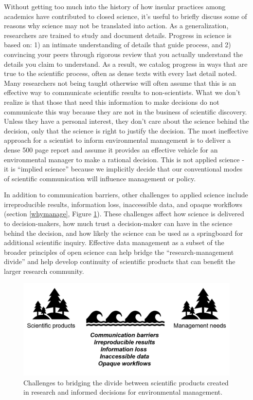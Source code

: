 \documentclass[
]{book}
\begin{document}
Without getting too much into the history of how insular practices among academics have contributed to closed science, it's useful to briefly discuss some of reasons why science may not be translated into action. As a generalization, researchers are trained to study and document details. Progress in science is based on: 1) an intimate understanding of details that guide process, and 2) convincing your peers through rigorous review that you actually understand the details you claim to understand. As a result, we catalog progress in ways that are true to the scientific process, often as dense texts with every last detail noted. Many researchers not being taught otherwise will often assume that this is an effective way to communicate scientific results to non-scientists. What we don't realize is that those that need this information to make decisions do not communicate this way because they are not in the business of scientific discovery. Unless they have a personal interest, they don't care about the science behind the decision, only that the science is right to justify the decision. The most ineffective approach for a scientist to inform environmental management is to deliver a dense 500 page report and assume it provides an effective vehicle for an environmental manager to make a rational decision. This is not applied science - it is ``implied science'' because we implicitly decide that our conventional modes of scientific communication will influence management or policy.

In addition to communication barriers, other challenges to applied science include irreproducible results, information loss, inaccessible data, and opaque workflows (section \ref{whymanage}, Figure \ref{fig:divide}). These challenges affect how science is delivered to decision-makers, how much trust a decision-maker can have in the science behind the decision, and how likely the science can be used as a springboard for additional scientific inquiry. Effective data management as a subset of the broader principles of open science can help bridge the ``research-management divide'' and help develop continuity of scientific products that can benefit the larger research community.

\begin{figure}

{\centering \includegraphics[width=0.8\linewidth]{img/divide2} 

}

\caption{Challenges to bridging the divide between scientific products created in research and informed decisions for environmental management.}\label{fig:divide}
\end{figure}
\end{document}

